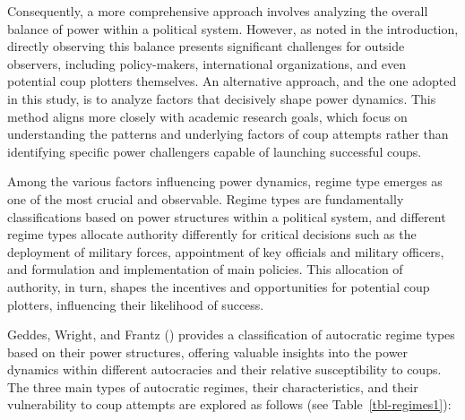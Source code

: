 \documentclass[
  12pt,
]{report}
\begin{document}
Consequently, a more comprehensive approach involves analyzing the
overall balance of power within a political system. However, as noted in
the introduction, directly observing this balance presents significant
challenges for outside observers, including policy-makers, international
organizations, and even potential coup plotters themselves. An
alternative approach, and the one adopted in this study, is to analyze
factors that decisively shape power dynamics. This method aligns more
closely with academic research goals, which focus on understanding the
patterns and underlying factors of coup attempts rather than identifying
specific power challengers capable of launching successful coups.

Among the various factors influencing power dynamics, regime type
emerges as one of the most crucial and observable. Regime types are
fundamentally classifications based on power structures within a
political system, and different regime types allocate authority
differently for critical decisions such as the deployment of military
forces, appointment of key officials and military officers, and
formulation and implementation of main policies. This allocation of
authority, in turn, shapes the incentives and opportunities for
potential coup plotters, influencing their likelihood of success.

Geddes, Wright, and Frantz () provides a
classification of autocratic regime types based on their power
structures, offering valuable insights into the power dynamics within
different autocracies and their relative susceptibility to coups. The
three main types of autocratic regimes, their characteristics, and their
vulnerability to coup attempts are explored as follows (see
Table~\ref{tbl-regimes1}):
\end{document}
